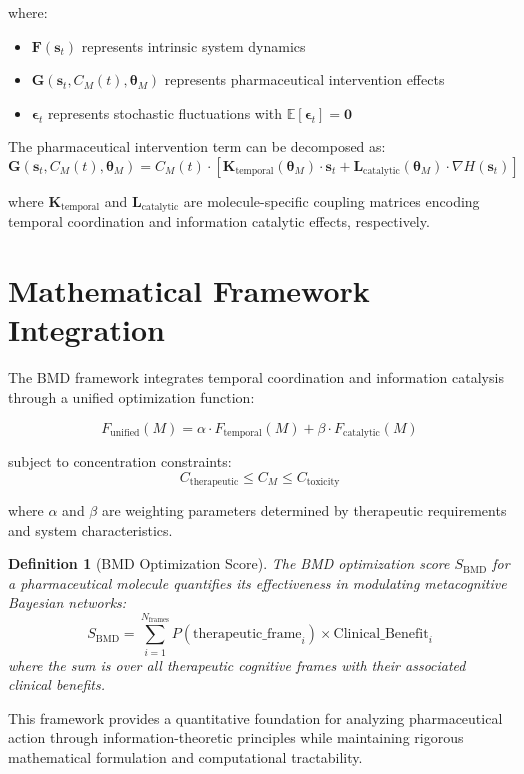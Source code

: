 \documentclass[12pt,a4paper]{article}
\newtheorem{definition}{Definition}[section]
\begin{document}
where:
\begin{itemize}
\item $\mathbf{F}(\mathbf{s}_t)$ represents intrinsic system dynamics
\item $\mathbf{G}(\mathbf{s}_t, C_M(t), \boldsymbol{\theta}_M)$ represents pharmaceutical intervention effects
\item $\boldsymbol{\epsilon}_t$ represents stochastic fluctuations with $\mathbb{E}[\boldsymbol{\epsilon}_t] = \mathbf{0}$
\end{itemize}

The pharmaceutical intervention term can be decomposed as:
\begin{equation}
\mathbf{G}(\mathbf{s}_t, C_M(t), \boldsymbol{\theta}_M) = C_M(t) \cdot \left[ \mathbf{K}_{\text{temporal}}(\boldsymbol{\theta}_M) \cdot \mathbf{s}_t + \mathbf{L}_{\text{catalytic}}(\boldsymbol{\theta}_M) \cdot \nabla H(\mathbf{s}_t) \right]
\end{equation}

where $\mathbf{K}_{\text{temporal}}$ and $\mathbf{L}_{\text{catalytic}}$ are molecule-specific coupling matrices encoding temporal coordination and information catalytic effects, respectively.

\section{Mathematical Framework Integration}

The BMD framework integrates temporal coordination and information catalysis through a unified optimization function:

\begin{equation}
F_{\text{unified}}(M) = \alpha \cdot F_{\text{temporal}}(M) + \beta \cdot F_{\text{catalytic}}(M)
\end{equation}

subject to concentration constraints:
\begin{equation}
C_{\text{therapeutic}} \leq C_M \leq C_{\text{toxicity}}
\end{equation}

where $\alpha$ and $\beta$ are weighting parameters determined by therapeutic requirements and system characteristics.

\begin{definition}[BMD Optimization Score]
The BMD optimization score $S_{\text{BMD}}$ for a pharmaceutical molecule quantifies its effectiveness in modulating metacognitive Bayesian networks:
\begin{equation}
S_{\text{BMD}} = \sum_{i=1}^{N_{\text{frames}}} P(\text{therapeutic\_frame}_i) \times \text{Clinical\_Benefit}_i
\end{equation}
where the sum is over all therapeutic cognitive frames with their associated clinical benefits.
\end{definition}

This framework provides a quantitative foundation for analyzing pharmaceutical action through information-theoretic principles while maintaining rigorous mathematical formulation and computational tractability.


\end{document}
